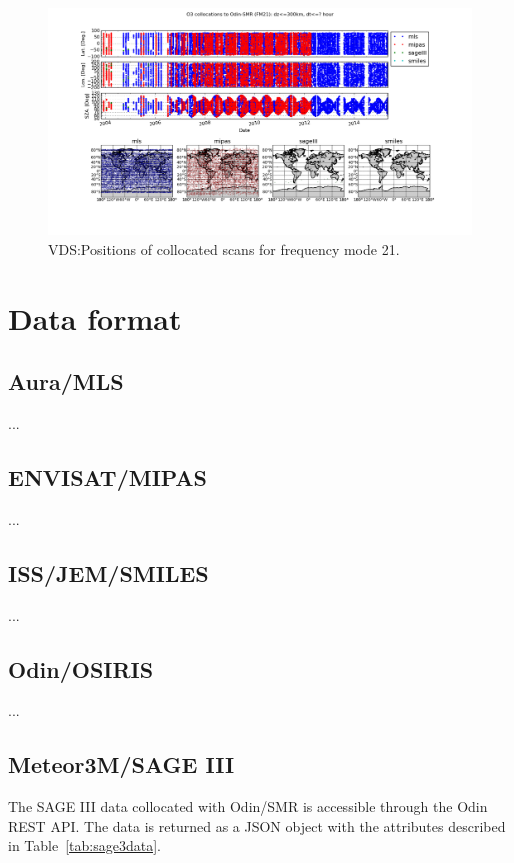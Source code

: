 \begin{figure}[t]
\centering
\includegraphics[width=17cm]{test_collocation_fm21.png}
\caption{VDS:Positions of collocated scans for frequency mode 21.}
\label{fig:vdsfm21}
\end{figure}



\section{Data format}
\subsection{Aura/MLS}
...

\subsection{ENVISAT/MIPAS}
...

\subsection{ISS/JEM/SMILES}
...

\subsection{Odin/OSIRIS}
...


\subsection{Meteor3M/SAGE III}
The SAGE III data collocated with Odin/SMR is accessible through the Odin REST
API. The data is returned as a JSON object with the attributes described in
Table~\ref{tab:sage3data}.

